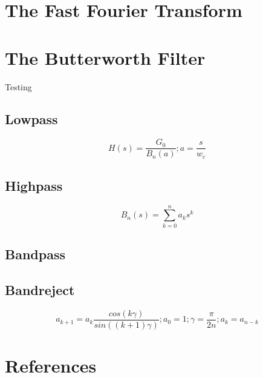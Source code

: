\documentclass[american, twoside]{article}
\begin{document}
\section{The Fast Fourier Transform} \label{FFT}

\section{The Butterworth Filter} \label{Butterworth}
Testing\cite{butterworthWikipedia}
\subsection{Lowpass} \label{Butterworth:Lowpass}
\begin{equation} \label{butterworth:lowpass_generic}
    H(s) = \frac{G_{0}}{B_{n}(a)}; a = \frac{s}{w_{c}}
\end{equation}

\subsection{Highpass} \label{Butterworth:Highpass}
\begin{equation} \label{butterworth:polynomial}
    B_{n}(s) = \sum_{k = 0}^{n} a_{k}s^{k}
\end{equation}

\subsection{Bandpass} \label{Butterworth:Bandpass}
\subsection{Bandreject} \label{Butterworth:Bandreject}
\begin{equation} \label{butterowrth:coefficients}
    a_{k + 1} = a_{k}\frac{cos\left(k\gamma\right)}{sin((k + 1)\gamma)}; a_{0} = 1; \gamma = \frac{\pi}{2n}; a_{k} = a_{n - k}
\end{equation}

\section{References} \label{References}
\printbibliography
\end{document}
